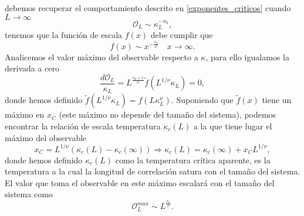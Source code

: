 debemos recuperar el comportamiento descrito en \ref{exponentes_criticos}
cuando $L\rightarrow \infty$ 
\begin{equation*}
\mathcal{O}_L\sim \kappa_L^{-x_0},
\end{equation*}
tenemos que la función de escala $f(x)$ debe cumplir que
\begin{equation*}
f(x)\sim x^{-\frac{x_0}{\nu}}\quad x\rightarrow \infty.
\end{equation*}
Analicemos el valor máximo del observable respecto a $\kappa$, para ello
igualamos la derivada a cero
\begin{equation*}
\frac{d\mathcal{O}_L}{\kappa_L}=L^{\frac{x_0+1}{\nu}}\tilde{f}(L^{1/\nu} \kappa_L)=0,
\end{equation*}
donde hemos definido $\tilde{f}(L^{1/\nu}\kappa_L)=f(L\kappa_L^{\nu})$. Suponiendo que
$\tilde{f}(x)$ tiene un máximo en $x_C$ (este máximo no depende del tamaño del
sistema), podemos encontrar la relación de escala
temperatura $\kappa_c(L)$ a la que tiene lugar el máximo del observable
\begin{equation*}
x_C=L^{1/\nu}(\kappa_c(L)-\kappa_c(\infty))\Rightarrow \kappa_c(L)=\kappa_c(\infty)+x_CL^{1/\nu},
\end{equation*}
donde hemos definido $\kappa_c(L)$ como la temperatura crítica aparente, es la temperatura a la cual
la longitud de correlación satura con el tamaño del sistema. El valor que toma
el observable en este máximo escalará con el tamaño del sistema como
\begin{equation*}
\mathcal{O}^{max}_L\sim L^{\frac{x_0}{\nu}}.
\end{equation*}

